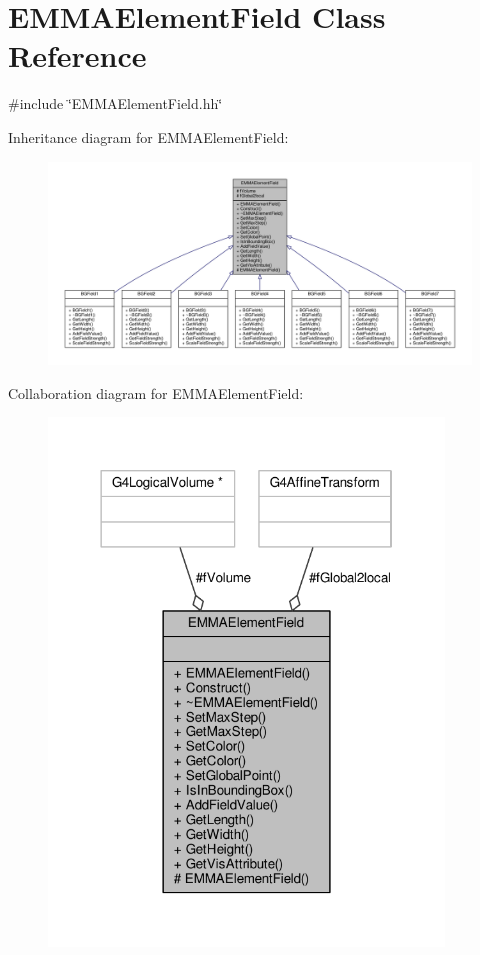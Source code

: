 \hypertarget{classEMMAElementField}{}\section{E\+M\+M\+A\+Element\+Field Class Reference}
\label{classEMMAElementField}


{\ttfamily \#include \char`\"{}E\+M\+M\+A\+Element\+Field.\+hh\char`\"{}}



Inheritance diagram for E\+M\+M\+A\+Element\+Field\+:
\nopagebreak
\begin{figure}[H]
\begin{center}
\leavevmode
\includegraphics[width=350pt]{classEMMAElementField__inherit__graph}
\end{center}
\end{figure}


Collaboration diagram for E\+M\+M\+A\+Element\+Field\+:
\nopagebreak
\begin{figure}[H]
\begin{center}
\leavevmode
\includegraphics[width=298pt]{classEMMAElementField__coll__graph}
\end{center}
\end{figure}
